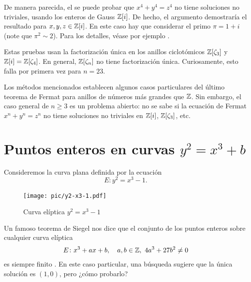 \begin{comentario}
  De manera parecida, el se puede probar que $x^4 + y^4 = z^4$ no tiene
  soluciones no triviales, usando los enteros de Gauss $\mathbb{Z} [i]$. De hecho, el
  argumento demostraría el resultado para $x,y,z\in \mathbb{Z} [i]$. En este caso hay
  que considerar el primo $\pi = 1 + i$ (note que $\pi^2 \sim 2$). Para los
  detalles, véase por ejemplo \cite[\S I.3]{Ribenboim-FLT}.

  Estas pruebas usan la factorización única en los anillos ciclotómicos
  $\mathbb{Z} [\zeta_3]$ y $\mathbb{Z} [i] = \mathbb{Z} [\zeta_4]$. En general, $\mathbb{Z} [\zeta_n]$
  no tiene factorización única. Curiosamente, esto falla por primera vez para
  $n = 23$.

  Los métodos mencionados establecen algunos casos particulares del último
  teorema de Fermat para anillos de números más grandes que $\mathbb{Z}$. Sin embargo,
  el caso general de $n \ge 3$ es un problema abierto: no se sabe si la ecuación
  de Fermat $x^n + y^n = z^n$ no tiene soluciones no triviales en $\mathbb{Z} [i]$,
  $\mathbb{Z} [\zeta_3]$, etc.
\end{comentario}


\section{Puntos enteros en curvas \texorpdfstring{$y^2 = x^3 + b$}{y² = x³ + b}}

Consideremos la curva plana definida por la ecuación
$$E\colon y^2 = x^3 - 1.$$

\begin{figure}
  \begin{center}
    \texttt{[image: pic/y2-x3-1.pdf]}
  \end{center}

  \caption{Curva elíptica $y^2 = x^3 - 1$}
  \label{fig:y2-x3-1}
\end{figure}

Un famoso teorema de Siegel nos dice que el conjunto de los puntos enteros sobre
cualquier curva elíptica
$$E\colon x^3 + ax + b, \quad a, b \in \mathbb{Z}, ~ 4a^3 + 27 b^2 \ne 0$$
es siempre finito \cite[\S X.3]{Silverman-GTM106}. En este caso particular,
una búsqueda sugiere que la única solución es $(1,0)$, pero ¿cómo probarlo?

